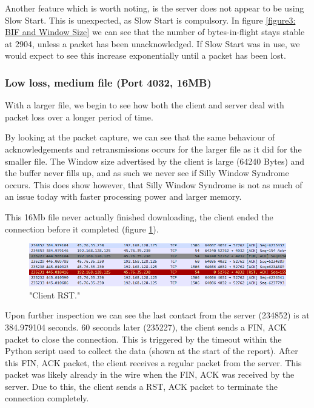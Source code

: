 \documentclass[12pt]{article}
\begin{document}
Another feature which is worth noting, is the server does not appear to be using Slow Start.
This is unexpected, as Slow Start is compulsory.
In figure \ref{figure3: BIF and Window Size} we can see that the number of bytes-in-flight stays stable at 2904, unless a packet has been unacknowledged.
If Slow Start was in use, we would expect to see this increase exponentially until a packet has been lost.

\subsubsection*{Low loss, medium file (Port 4032, 16MB)}
With a larger file, we begin to see how both the client and server deal with packet loss over a longer period of time.


By looking at the packet capture, we can see that the same behaviour of acknowledgements and retransmissions occurs for the larger file as it did for the smaller file.
The Window size advertised by the client is large (64240 Bytes) and the buffer never fills up, and as such we never see if Silly Window Syndrome occurs.
This does show however, that Silly Window Syndrome is not as much of an issue today with faster processing power and larger memory.

This 16Mb file never actually finished downloading, the client ended the connection before it completed (figure \ref{figure7: 4032:16M RST}).

\begin{figure}[!htbp]
  \centering
  \includegraphics[width=\linewidth]{4032-16M-RST.PNG}
  \caption{"Client RST."}
  \label{figure7: 4032:16M RST}
\end{figure}

Upon further inspection we can see the last contact from the server (234852) is at 384.979104 seconds.
60 seconds later (235227), the client sends a FIN, ACK packet to close the connection.
This is triggered by the timeout within the Python script used to collect the data (shown at the start of the report).
After this FIN, ACK packet, the client receives a regular packet from the server. 
This packet was likely already in the wire when the FIN, ACK was received by the server.
Due to this, the client sends a RST, ACK packet to terminate the connection completely.
\end{document}
